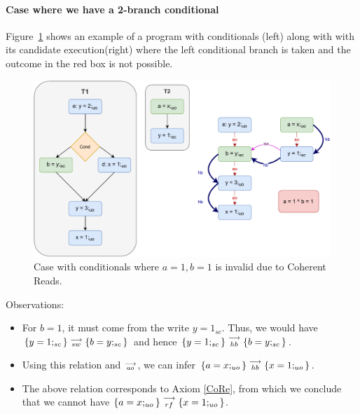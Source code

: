 
    \paragraph{Case where we have a 2-branch conditional}
    
    Figure~\ref{reord:cond_counter_example1(a)} shows an example of a program with conditionals (left) along with with its candidate execution(right) where the left conditional branch is taken and the outcome in the red box is not possible. 
    \begin{figure}[H]
        \centering 
        \includegraphics[scale=0.7]{7.CounterExamples/ReorderingConditionals/CounterExamples1a(Conditionals).pdf}
        \caption{Case with conditionals where $a = 1, b = 1$ is invalid due to Coherent Reads.}
        \label{reord:cond_counter_example1(a)}
    \end{figure}
    
    Observations:
    \begin{itemize}
        \item For $b=1$, it must come from the write $y=1_{sc}$. 
        Thus, we would have $\{y=1;_{sc}\}\stackrel{\longrightarrow}{_{sw}}\{b=y;_{sc}\}$ and hence $\{y=1;_{sc}\}\stackrel{\longrightarrow}{_{hb}}\{b=y;_{sc}\}$.
        \item Using this relation and $\stackrel{\longrightarrow}{_{ao}}$, we can infer $\{a=x;_{uo}\}\stackrel{\longrightarrow}{_{hb}}\{x=1;_{uo}\}$.
        \item The above relation corresponds to Axiom \ref{CoRe}, from which we conclude that we cannot have $\{a=x;_{uo}\}\stackrel{\longrightarrow}{_{rf}}\{x=1;_{uo}\}$.
    \end{itemize}
    
